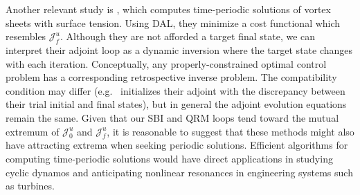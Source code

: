 \documentclass[%
 reprint,
 amsmath,amssymb,
 aps,
 pre,
]{revtex4-2}
\newcommand{\Juo}{\mathcal{J}^{u}_0}
\newcommand{\Juf}{\mathcal{J}^{u}_f}
\begin{document}
Another relevant study is \cite{Ambrose2015}, which computes time-periodic solutions of vortex sheets with surface tension.
Using DAL, they minimize a cost functional which resembles $\Juf$.
Although they are not afforded a target final state, we can interpret their adjoint loop as a dynamic inversion where the target state changes with each iteration.
Conceptually, any properly-constrained optimal control problem has a corresponding retrospective inverse problem.
The compatibility condition may differ (e.g.~\cite{Ambrose2015} initializes their adjoint with the discrepancy between their trial initial and final states), but in general the adjoint evolution equations remain the same.
Given that our SBI and QRM loops tend toward the mutual extremum of $\Juo$ and $\Juf$, it is reasonable to suggest that these methods might also have attracting extrema when seeking periodic solutions.
Efficient algorithms for computing time-periodic solutions would have direct applications in studying cyclic dynamos and anticipating nonlinear resonances in engineering systems such as turbines.


\end{document}
